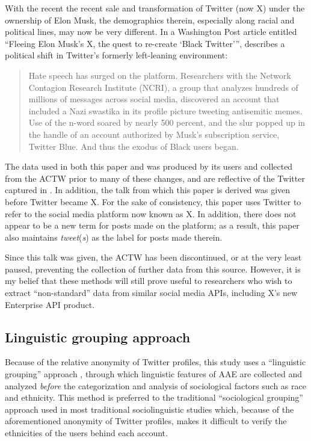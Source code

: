 \documentclass[output=paper,draftmode,colorlinks,citecolor=brown]{langscibook}
\begin{document}
With the recent the recent sale and transformation of Twitter (now X) under the ownership of Elon Musk, the demographics therein, especially along racial and political lines, may now be very different. In a Washington Post article entitled “Fleeing Elon Musk's X, the quest to re-create ‘Black Twitter’”, \citet{Dwoskin2023} describes a political shift in Twitter's formerly left-leaning environment:


\begin{quote}
Hate speech has surged on the platform. Researchers with the Network Contagion Research Institute (NCRI), a group that analyzes hundreds of millions of messages across social media, discovered an account that included a Nazi swastika in its profile picture tweeting antisemitic memes. Use of the n-word soared by nearly 500 percent, and the slur popped up in the handle of an account authorized by Musk’s subscription service, Twitter Blue. And thus the exodus of Black users began.
\citep{Dwoskin2023}
\end{quote}


The data used in both this paper and \citet{chapters/02-baxterEtAl} was produced by its users and collected from the ACTW prior to many of these changes, and are reflective of the Twitter captured in \citet{WojcikHughes2019}. In addition, the talk from which this paper is derived was given before Twitter became X. For the sake of consistency, this paper uses Twitter to refer to the social media platform now known as X. In addition, there does not appear to be a new term for posts made on the platform; as a result, this paper also maintains \textit{tweet}(\textit{s}) as the label for posts made therein.

Since this talk was given, the ACTW has been discontinued, or at the very least paused, preventing the collection of further data from this source. However, it is my belief that these methods will still prove useful to researchers who wish to extract “non-standard” data from similar social media APIs, including X’s new Enterprise API product.

\subsection{Linguistic grouping approach}
\label{sec:baxter:2.3}

Because of the relative anonymity of Twitter profiles, this study uses a “linguistic grouping” approach \citep{HorvathSankoff1987}, through which linguistic features of AAE are collected and analyzed \textit{before} the categorization and analysis of sociological factors such as race and ethnicity. This method is preferred to the traditional “sociological grouping” approach used in most traditional sociolinguistic studies which, because of the aforementioned anonymity of Twitter profiles, makes it difficult to verify the ethnicities of the users behind each account.
\end{document}

